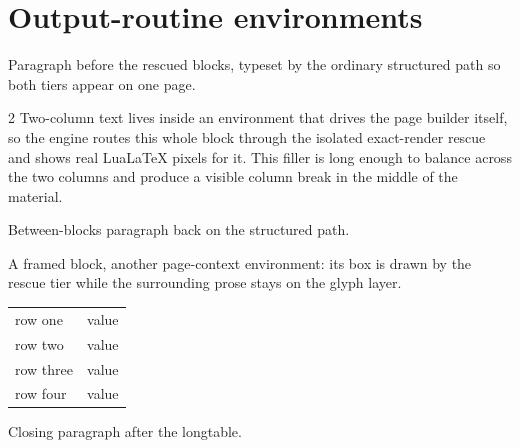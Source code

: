 \documentclass[11pt,a4paper]{article}
\begin{document}
\section{Output-routine environments}

Paragraph before the rescued blocks, typeset by the ordinary structured
path so both tiers appear on one page.

\begin{multicols}{2}
Two-column text lives inside an environment that drives the page builder
itself, so the engine routes this whole block through the isolated
exact-render rescue and shows real LuaLaTeX pixels for it. This filler is
long enough to balance across the two columns and produce a visible
column break in the middle of the material.
\end{multicols}

Between-blocks paragraph back on the structured path.

\begin{framed}
A framed block, another page-context environment: its box is drawn by the
rescue tier while the surrounding prose stays on the glyph layer.
\end{framed}

\begin{longtable}{ll}
row one   & value \\
row two   & value \\
row three & value \\
row four  & value \\
\end{longtable}

Closing paragraph after the longtable.
\end{document}
